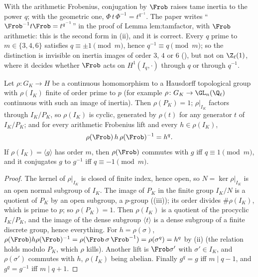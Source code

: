 \begin{warning}\label{warn:local:tame-sign}
With the arithmetic Frobenius, conjugation by $\Frob$ raises tame inertia to the power $q$; with the geometric one, $\Phi\,t\,\Phi^{-1}=t^{q^{-1}}$. The
paper writes ``$\Frob^{-1}t\Frob=t^{q^{-1}}$'' in the proof of Lemma lem:tamfactor, with $\Frob$ arithmetic: this is the second form in
(ii), and it is correct. Every $q$ prime to $m\in\{3,4,6\}$ satisfies $q\equiv\pm1\pmod m$, hence $q^{-1}\equiv q\pmod m$; so the
distinction is invisible on inertia images of order $3$, $4$ or $6$ (), but not on $\Z_\ell(1)$, where it decides
whether $\Frob$ acts on $H^1(I_q,\cdot)$ through $q$ or through $q^{-1}$.
\end{warning}

\begin{corollary}\label{cor:local:finite-tame-image}
Let $\rho\colon G_K\to H$ be a continuous homomorphism to a Hausdorff topological group with $\rho(I_K)$ finite of order prime to $p$ (for example
$\rho\colon G_K\to\GL_n(\Q_\ell)$ continuous with such an image of inertia). Then $\rho(P_K)=1$; $\rho|_{I_K}$ factors through $I_K/P_K$, so $\rho(I_K)$ is cyclic,
generated by $\rho(t)$ for any generator $t$ of $I_K/P_K$; and for every arithmetic Frobenius lift and every $h\in\rho(I_K)$,
\[
\rho(\Frob)\,h\,\rho(\Frob)^{-1}=h^q .
\]
If $\rho(I_K)=\langle g\rangle$ has order $m$, then $\rho(\Frob)$ commutes with $g$ iff $q\equiv1\pmod m$, and it conjugates $g$ to $g^{-1}$ iff
$q\equiv-1\pmod m$.
\end{corollary}

\begin{proof}
The kernel of $\rho|_{I_K}$ is closed of finite index, hence open, so $N=\ker\rho|_{I_K}$ is an open normal subgroup of $I_K$. The image of $P_K$ in the
finite group $I_K/N$ is a quotient of $P_K$ by an open subgroup, a $p$-group ((iii)); its order divides $\#\rho(I_K)$,
which is prime to $p$; so $\rho(P_K)=1$. Then $\rho(I_K)$ is a quotient of the procyclic $I_K/P_K$, and the image of the dense subgroup $\langle t\rangle$ is a
dense subgroup of a finite discrete group, hence everything. For $h=\rho(\sigma)$, $\rho(\Frob)h\rho(\Frob)^{-1}=\rho(\Frob\,\sigma\,\Frob^{-1})=\rho(\sigma^q)=h^q$ by
(ii) (the relation holds modulo $P_K$, which $\rho$ kills). Another lift is $\Frob\sigma'$ with $\sigma'\in I_K$, and $\rho(\sigma')$ commutes with
$h$, $\rho(I_K)$ being abelian. Finally $g^q=g$ iff $m\mid q-1$, and $g^q=g^{-1}$ iff $m\mid q+1$.
\end{proof}

